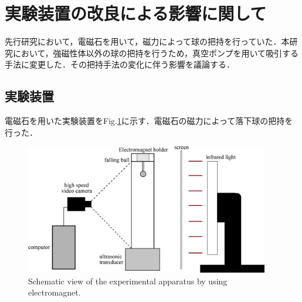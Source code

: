 \section{実験装置の改良による影響に関して}
\label{sec:reexp}

先行研究\cite{ref:8}において，電磁石を用いて，磁力によって球の把持を行っていた．本研究において，強磁性体以外の球の把持を行うため，真空ポンプを用いて吸引する手法に変更した．その把持手法の変化に伴う影響を議論する．

\subsection{実験装置}

電磁石を用いた実験装置をFig.\ref{fig:magnet_device}に示す．電磁石の磁力によって落下球の把持を行った．

\begin{figure}[ht]
    \centering
    \includegraphics[width=0.95\textwidth]{X-Appendix/device/magnet_device.eps}
    \caption{Schematic view of the experimental apparatus by using electromagnet.}
    \label{fig:magnet_device}
\end{figure}



